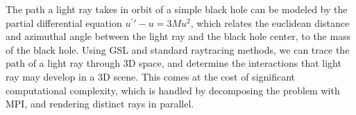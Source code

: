 The path a light ray takes in orbit of a simple black hole can be modeled by
the partial differential equation $u^\prime\prime - u = 3Mu^2$, which relates
the euclidean distance and azimuthal angle between the light ray and the black
hole center, to the mass of the black hole.
Using GSL and standard raytracing methods, we can trace the path of a light ray
through 3D space, and determine the interactions that light ray may develop in a 3D scene.
This comes at the cost of significant computational complexity, which is handled by decomposing
the problem with MPI, and rendering distinct rays in parallel.


